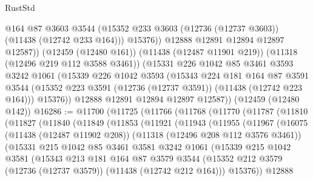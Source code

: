\begin{lexlean}{RustStd}
\begin{coremodule}
              @164
              @87
              @3603
              @3544
              (@15352 @233 @3603 (@12736 (@12737 @3603)) (@11438 (@12742 @233 @164)))
              @15376))
          @12888
          @12891
          @12894
          @12897
          @12587))
      (@12459 (@12480 @161))
      (@11438 (@12487 @11901 @219))
      (@11318 (@12496 @219 @112 @3588 @3461))
      (@15331
        @226
        @1042
        @85
        @3461
        @3593
        @3242
        @1061
        (@15339
          @226
          @1042
          @3593
          (@15343
            @224
            @181
            @164
            @87
            @3591
            @3544
            (@15352 @223 @3591 (@12736 (@12737 @3591)) (@11438 (@12742 @223 @164)))
            @15376))
        @12888
        @12891
        @12894
        @12897
        @12587))
    (@12459 (@12480 @142))
@16286 := @11700
    (@11725
      (@11766
        (@11768
          (@11770
            (@11787
              (@11810
                (@11827
                  (@11840
                    (@11849
                      (@11853
                        (@11921
                          (@11943
                            (@11955
                              (@11967
                                (@16075
                                  (@11438 (@12487 @11902 @208))
                                  (@11318 (@12496 @208 @112 @3576 @3461))
                                  (@15331
                                    @215
                                    @1042
                                    @85
                                    @3461
                                    @3581
                                    @3242
                                    @1061
                                    (@15339
                                      @215
                                      @1042
                                      @3581
                                      (@15343
                                        @213
                                        @181
                                        @164
                                        @87
                                        @3579
                                        @3544
                                        (@15352
                                          @212
                                          @3579
                                          (@12736 (@12737 @3579))
                                          (@11438 (@12742 @212 @164)))
                                        @15376))
                                    @12888

\end{coremodule}
\end{lexlean}

